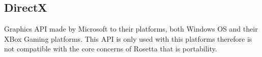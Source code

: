 
\subsection{DirectX} %
\label{sub:directx}
Graphics API made by Microsoft to their platforms, both Windows OS and their XBox Gaming platforms. This API is only used with this platforms therefore is not compatible with the core concerns of Rosetta that is portability.

